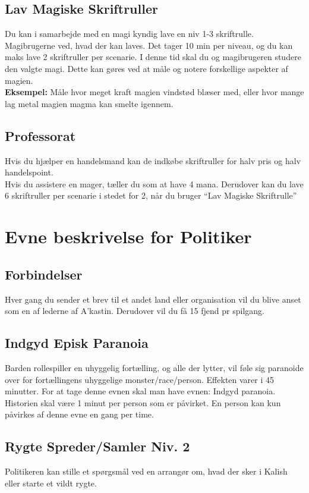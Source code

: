 \subsection*{Lav Magiske Skriftruller}
Du kan i samarbejde med en magi kyndig lave en niv 1-3 skriftrulle. Magibrugerne ved, hvad der kan laves. Det tager 10 min per niveau, og du kan maks lave 2 skriftruller per scenarie. I denne tid skal du og magibrugeren studere den valgte magi. Dette kan gøres ved at måle og notere forskellige aspekter af magien.\\ \textbf{Eksempel:} Måle hvor meget kraft magien vindstød blæser med, eller hvor mange lag metal magien magma kan smelte igennem.

\subsection*{Professorat}
Hvis du hjælper en handelsmand kan de indkøbe skriftruller for halv pris og halv handelspoint.\\
Hvis du assistere en mager, tæller du som at have 4 mana.
Derudover kan du lave 6 skriftruller per scenarie i stedet for 2, når du bruger “Lav Magiske Skriftrulle”


\section*{Evne beskrivelse for Politiker}

\subsection*{Forbindelser}
Hver gang du sender et brev til et andet land eller organisation vil du blive anset
som en af lederne af A’kastin. Derudover vil du få 15 fjend pr spilgang.


\subsection*{Indgyd Episk Paranoia}
Barden rollespiller en uhyggelig fortælling,
og alle der lytter, vil føle sig paranoide
over for fortællingens uhyggelige
monster/race/person. Effekten varer i 45 minutter. For at tage denne evnen skal man have evnen: Indgyd paranoia. Historien skal være 1 minut per person som er påvirket. En person kan kun påvirkes af denne evne en gang per time.

\subsection*{Rygte Spreder/Samler Niv. 2}
Politikeren kan stille et spørgsmål ved en arrangør om, hvad der sker i Kalish eller starte et vildt rygte.
